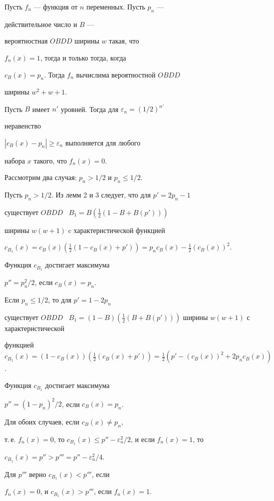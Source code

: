 \begin{thm}


Пусть $f_n$ --- функция от $n$ переменных. Пусть $p_n$ ---


действительное число и $B$ ---


вероятностная $OBDD$ ширины $w$ такая, что


$f_n(x)=1$, тогда и только тогда, когда


$c_B(x)=p_n$. Тогда $f_n$ вычислима вероятностной $OBDD$


ширины $w^2+w+1$.


\end{thm}








\begin{pf}


Пусть $B$ имеет $n'$ уровней. Тогда для $\varepsilon_n=(1/2)^{n'}$


неравенство


$|c_B(x)-p_n|\ge\varepsilon_n$ выполняется для любого


набора $x$ такого, что $f_n(x)=0$.





Рассмотрим два случая: $p_n>1/2$ и $p_n\le 1/2$.


Пусть $p_n>1/2$. Из лемм 2 и 3 следует, что для $p'=2p_n-1$


существует $OBDD$ \ $B_1=B(\frac{1}{2}(1-B+B(p')))$


ширины $w(w+1)$ c характеристической функцией


$c_{B_1}(x)=c_B(x)(\frac{1}{2}(1-c_B(x)+p'))=


p_n c_B(x)-\frac{1}{2} (c_B(x))^2 $.


Функция $c_{B_1}$ достигает максимума


$p''=p_n^2/2$, если $c_B(x)=p_n$.




Если $p_n\le 1/2$, то для $p'=1-2p_n$


существует $OBDD$ \ $B_1=(1-B)(\frac{1}{2}


(B+B(p')))$ ширины $w(w+1)$ с характеристической


функцией $c_{B_1}(x)=(1-c_B(x))(\frac{1}{2}(c_B(x)+p'))=


\frac{1}{2} (p'- (c_B(x))^2 +2 p_n c_B(x))$.


Функция $c_{B_1}$ достигает максимума


$p''=(1-p_n)^2/2$, если $c_B(x)=p_n$.




Для обоих случаев, если $c_B(x)\ne p_n$,


т.\,е. $f_n(x)=0$, то $c_{B_1}(x)\le


p''-\varepsilon_n^2/2$, и если $f_n(x)=1$, то


$c_{B_1}(x)= p''> p'''=p''-\varepsilon_n^2/4$.


Для $p'''$ верно $c_{B_1}(x)<p'''$, если


$f_n(x)=0$, и $c_{B_1}(x)>p'''$, если $f_n(x)=1$.


\end{pf}

